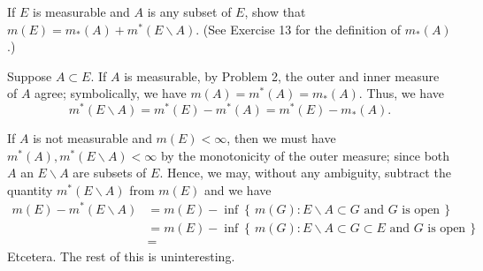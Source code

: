 \begin{problem}
  If $E$ is measurable and $A$ is any subset of $E$, show that
  $m(E)=m_*(A)+m^*(E\smallsetminus A)$. (See Exercise 13 for the definition
  of $m_*(A)$.)
\end{problem}
\begin{solution}
  Suppose $A\subset E$. If $A$ is measurable, by Problem 2, the outer and
  inner measure of $A$ agree; symbolically, we have
  $m(A)=m^*(A)=m_*(A)$. Thus, we have
  \[
    m^*(E\smallsetminus A)=m^*(E)-m^*(A)=m^*(E)-m_*(A).
  \]

  If $A$ is not measurable and $m(E)<\infty$, then
  we must have $m^*(A),m^*(E\smallsetminus A)<\infty$ by the monotonicity
  of the outer measure; since both $A$ an $E\smallsetminus A$ are subsets
  of $E$. Hence, we may, without any ambiguity, subtract the quantity
  $m^*(E\smallsetminus A)$ from $m(E)$ and we have
  \begin{align*}
    m(E)-m^*(E\smallsetminus A)
    &=m(E)
      -\inf\left\{\,m(G):\text{$E\smallsetminus A\subset G$ and $G$ is
      open}\,\right\}\\
    &=m(E)
      -\inf\left\{\,m(G):\text{$E\smallsetminus A\subset G\subset E$ and $G$ is
      open}\,\right\}\\
    &=
  \end{align*}
  Etcetera. The rest of this is uninteresting.
\end{solution}

